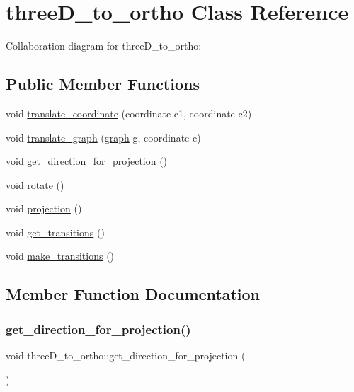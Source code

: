 \hypertarget{classthreeD__to__ortho}{}\section{three\+D\+\_\+to\+\_\+ortho Class Reference}
\label{classthreeD__to__ortho}


Collaboration diagram for three\+D\+\_\+to\+\_\+ortho\+:
\subsection*{Public Member Functions}
\begin{DoxyCompactItemize}
\item 
void \hyperlink{classthreeD__to__ortho_a3d16f355dc29a6de3073700246a50fc0}{translate\+\_\+coordinate} (coordinate c1, coordinate c2)
\item 
void \hyperlink{classthreeD__to__ortho_a721cf3d866a5b6abf941c726fca3cadc}{translate\+\_\+graph} (\hyperlink{structgraph}{graph} g, coordinate c)
\item 
void \hyperlink{classthreeD__to__ortho_aee77836500d9b77c9485fd782496d91b}{get\+\_\+direction\+\_\+for\+\_\+projection} ()
\item 
void \hyperlink{classthreeD__to__ortho_a14f6162b721d0f59aec4b08b38e45212}{rotate} ()
\item 
void \hyperlink{classthreeD__to__ortho_a566486a4d1907f4fef666fc2df837786}{projection} ()
\item 
void \hyperlink{classthreeD__to__ortho_a755b7a3d0121bb909a2a564e1b192bf6}{get\+\_\+transitions} ()
\item 
void \hyperlink{classthreeD__to__ortho_af25b29a601ee4b49c3db58ac6e96126c}{make\+\_\+transitions} ()
\end{DoxyCompactItemize}


\subsection{Member Function Documentation}
\mbox{\label{classthreeD__to__ortho_aee77836500d9b77c9485fd782496d91b}} 
\subsubsection{\texorpdfstring{get\+\_\+direction\+\_\+for\+\_\+projection()}{get\_direction\_for\_projection()}}
{\footnotesize\ttfamily void three\+D\+\_\+to\+\_\+ortho\+::get\+\_\+direction\+\_\+for\+\_\+projection (\begin{DoxyParamCaption}{ }\end{DoxyParamCaption})\hspace{0.3cm}{\ttfamily [inline]}}

